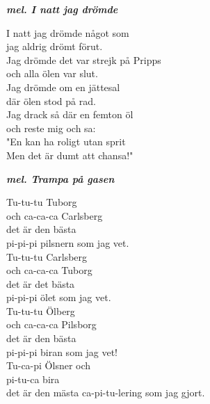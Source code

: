 \documentclass[a6paper,10pt]{article}
\newcommand{\mel}[1]{\small\textbf{\textit{mel. #1 \\}}}
\begin{document}
\setlength{\oddsidemargin}{-0.47in}
\begin{center}
    \mel{I natt jag drömde}
\end{center}
\begin{lyrics}
I natt jag drömde något som\\
jag aldrig drömt förut.\\
Jag drömde det var strejk på Pripps\\
och alla ölen var slut.
\vspace{5pt}\\
Jag drömde om en jättesal\\
där ölen stod på rad.\\
Jag drack så där en femton öl\\
och reste mig och sa:
\vspace{5pt}\\
"En kan ha roligt utan sprit\\
Men det är dumt att chansa!"
\end{lyrics}
\begin{center}
    \mel{Trampa på gasen}
\end{center}
\begin{lyrics}
Tu-tu-tu Tuborg\\
och ca-ca-ca Carlsberg\\
det är den bästa \\
pi-pi-pi pilsnern som jag vet.
\vspace{5pt} \\
Tu-tu-tu Carlsberg\\
och ca-ca-ca Tuborg\\
det är det bästa\\
pi-pi-pi ölet som jag vet.
\vspace{5pt} \\
Tu-tu-tu Ölberg\\
och ca-ca-ca Pilsborg\\
det är den bästa \\
pi-pi-pi biran som jag vet!
\vspace{5pt}\\
Tu-ca-pi Ölsner och \\
pi-tu-ca bira\\
det är den mästa ca-pi-tu-lering som jag gjort.
\end{lyrics}
\end{document}
